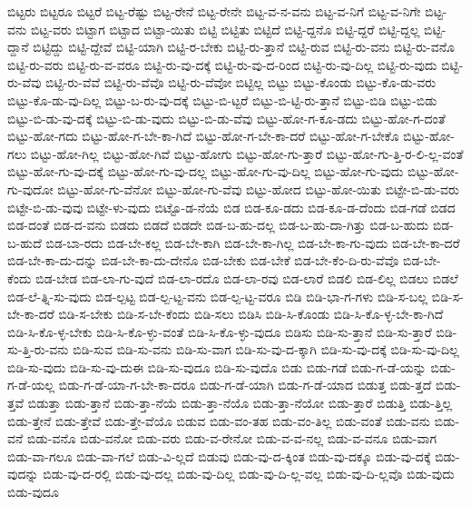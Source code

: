 {ಬಿಟ್ಟರು
ಬಿಟ್ಟರೂ
ಬಿಟ್ಟರೆ
ಬಿಟ್ಟ-ರೆಷ್ಟು
ಬಿಟ್ಟ-ರೇನೆ
ಬಿಟ್ಟ-ರೇನೇ
ಬಿಟ್ಟ-ವ-ನ-ವನು
ಬಿಟ್ಟ-ವ-ನಿಗೆ
ಬಿಟ್ಟ-ವ-ನಿಗೇ
ಬಿಟ್ಟ-ವನು
ಬಿಟ್ಟ-ವರು
ಬಿಟ್ಟಾಗ
ಬಿಟ್ಟಾದ
ಬಿಟ್ಟಾ-ಯಿತು
ಬಿಟ್ಟಿ
ಬಿಟ್ಟಿತು
ಬಿಟ್ಟಿದೆ
ಬಿಟ್ಟಿ-ದ್ದನೊ
ಬಿಟ್ಟಿ-ದ್ದರೆ
ಬಿಟ್ಟಿ-ದ್ದಲ್ಲ
ಬಿಟ್ಟಿ-ದ್ದಾನೆ
ಬಿಟ್ಟಿದ್ದು
ಬಿಟ್ಟಿ-ದ್ದೇವೆ
ಬಿಟ್ಟಿ-ಯಾಗಿ
ಬಿಟ್ಟಿ-ರ-ಬೇಕು
ಬಿಟ್ಟಿ-ರು-ತ್ತಾನೆ
ಬಿಟ್ಟಿ-ರುವ
ಬಿಟ್ಟಿ-ರು-ವನು
ಬಿಟ್ಟಿ-ರು-ವನೊ
ಬಿಟ್ಟಿ-ರು-ವರು
ಬಿಟ್ಟಿ-ರು-ವ-ವರೂ
ಬಿಟ್ಟಿ-ರು-ವು-ದಕ್ಕೆ
ಬಿಟ್ಟಿ-ರು-ವು-ದ-ರಿಂದ
ಬಿಟ್ಟಿ-ರು-ವು-ದಿಲ್ಲ
ಬಿಟ್ಟಿ-ರು-ವುದು
ಬಿಟ್ಟಿ-ರು-ವೆವು
ಬಿಟ್ಟಿ-ರು-ವೆವೆ
ಬಿಟ್ಟಿ-ರು-ವೆವೊ
ಬಿಟ್ಟಿ-ರು-ವೆವೋ
ಬಿಟ್ಟಿಲ್ಲ
ಬಿಟ್ಟು
ಬಿಟ್ಟು-ಕೊಂಡು
ಬಿಟ್ಟು-ಕೊ-ಡು-ವರು
ಬಿಟ್ಟು-ಕೊ-ಡು-ವು-ದಿಲ್ಲ
ಬಿಟ್ಟು-ಬ-ರು-ವು-ದಕ್ಕೆ
ಬಿಟ್ಟು-ಬಿ-ಟ್ಟರೆ
ಬಿಟ್ಟು-ಬಿ-ಟ್ಟಿ-ರು-ತ್ತಾನೆ
ಬಿಟ್ಟು-ಬಿಡಿ
ಬಿಟ್ಟು-ಬಿಡು
ಬಿಟ್ಟು-ಬಿ-ಡು-ವು-ದಕ್ಕೆ
ಬಿಟ್ಟು-ಬಿ-ಡು-ವುದು
ಬಿಟ್ಟು-ಬಿ-ಡು-ವೆವು
ಬಿಟ್ಟು-ಹೋ-ಗ-ಕೂ-ಡದು
ಬಿಟ್ಟು-ಹೋ-ಗ-ದಂತೆ
ಬಿಟ್ಟು-ಹೋ-ಗದು
ಬಿಟ್ಟು-ಹೋ-ಗ-ಬೇ-ಕಾ-ಗಿದೆ
ಬಿಟ್ಟು-ಹೋ-ಗ-ಬೇ-ಕಾ-ದರೆ
ಬಿಟ್ಟು-ಹೋ-ಗ-ಬೇಕೊ
ಬಿಟ್ಟು-ಹೋ-ಗಲು
ಬಿಟ್ಟು-ಹೋ-ಗಿಲ್ಲ
ಬಿಟ್ಟು-ಹೋ-ಗಿವೆ
ಬಿಟ್ಟು-ಹೋಗು
ಬಿಟ್ಟು-ಹೋ-ಗು-ತ್ತಾರೆ
ಬಿಟ್ಟು-ಹೋ-ಗು-ತ್ತಿ-ರ-ಲಿ-ಲ್ಲ-ವಂತೆ
ಬಿಟ್ಟು-ಹೋ-ಗು-ವು-ದಕ್ಕೆ
ಬಿಟ್ಟು-ಹೋ-ಗು-ವು-ದಲ್ಲ
ಬಿಟ್ಟು-ಹೋ-ಗು-ವು-ದಿಲ್ಲ
ಬಿಟ್ಟು-ಹೋ-ಗು-ವುದು
ಬಿಟ್ಟು-ಹೋ-ಗು-ವುದೋ
ಬಿಟ್ಟು-ಹೋ-ಗು-ವೆನೋ
ಬಿಟ್ಟು-ಹೋ-ಗು-ವೆವು
ಬಿಟ್ಟು-ಹೋದ
ಬಿಟ್ಟು-ಹೋ-ಯಿತು
ಬಿಟ್ಟೇ-ಬಿ-ಡು-ವರು
ಬಿಟ್ಟೇ-ಬಿ-ಡು-ವುವು
ಬಿಟ್ಟೇ-ಳು-ವುದು
ಬಿಟ್ಟೊ-ಡ-ನೆಯೆ
ಬಿಡ
ಬಿಡ-ಕೂ-ಡದು
ಬಿಡ-ಕೂ-ಡ-ದೆಂದು
ಬಿಡ-ಗಡೆ
ಬಿಡದ
ಬಿಡ-ದಂತೆ
ಬಿಡ-ದ-ವನು
ಬಿಡದು
ಬಿಡದೆ
ಬಿಡದೇ
ಬಿಡ-ಬ-ಹು-ದಲ್ಲ
ಬಿಡ-ಬ-ಹು-ದಾ-ಗಿತ್ತು
ಬಿಡ-ಬ-ಹುದು
ಬಿಡ-ಬ-ಹುದೆ
ಬಿಡ-ಬಾ-ರದು
ಬಿಡ-ಬೇ-ಕಲ್ಲ
ಬಿಡ-ಬೇ-ಕಾಗಿ
ಬಿಡ-ಬೇ-ಕಾ-ಗಿಲ್ಲ
ಬಿಡ-ಬೇ-ಕಾ-ಗು-ವುದು
ಬಿಡ-ಬೇ-ಕಾ-ದರೆ
ಬಿಡ-ಬೇ-ಕಾ-ದು-ದನ್ನು
ಬಿಡ-ಬೇ-ಕಾ-ದು-ದೇನೊ
ಬಿಡ-ಬೇಕು
ಬಿಡ-ಬೇಕೆ
ಬಿಡ-ಬೇ-ಕೆಂ-ದಿ-ರು-ವೆವೊ
ಬಿಡ-ಬೇ-ಕೆಂದು
ಬಿಡ-ಬೇಡ
ಬಿಡ-ಲಾ-ಗು-ವುದೆ
ಬಿಡ-ಲಾ-ರದೊ
ಬಿಡ-ಲಾ-ರವು
ಬಿಡ-ಲಾರೆ
ಬಿಡಲಿ
ಬಿಡ-ಲಿಲ್ಲ
ಬಿಡಲು
ಬಿಡಲೆ
ಬಿಡ-ಲೆ-ತ್ನಿ-ಸು-ವುದು
ಬಿಡ-ಲ್ಪಟ್ಟ
ಬಿಡ-ಲ್ಪ-ಟ್ಟ-ವನು
ಬಿಡ-ಲ್ಪ-ಟ್ಟ-ವರೂ
ಬಿಡಿ
ಬಿಡಿ-ಭಾ-ಗ-ಗಳು
ಬಿಡಿ-ಸ-ಬಲ್ಲ
ಬಿಡಿ-ಸ-ಬೇ-ಕಾ-ದರೆ
ಬಿಡಿ-ಸ-ಬೇಕು
ಬಿಡಿ-ಸ-ಬೇ-ಕೆಂದು
ಬಿಡಿ-ಸಲು
ಬಿಡಿಸಿ
ಬಿಡಿ-ಸಿ-ಕೊಂಡು
ಬಿಡಿ-ಸಿ-ಕೊ-ಳ್ಳ-ಬೇ-ಕಾ-ಗಿದೆ
ಬಿಡಿ-ಸಿ-ಕೊ-ಳ್ಳ-ಬೇಕು
ಬಿಡಿ-ಸಿ-ಕೊ-ಳ್ಳು-ವಂತೆ
ಬಿಡಿ-ಸಿ-ಕೊ-ಳ್ಳು-ವುದೂ
ಬಿಡಿಸು
ಬಿಡಿ-ಸು-ತ್ತಾನೆ
ಬಿಡಿ-ಸು-ತ್ತಾರೆ
ಬಿಡಿ-ಸು-ತ್ತಿ-ರು-ವನು
ಬಿಡಿ-ಸುವ
ಬಿಡಿ-ಸು-ವನು
ಬಿಡಿ-ಸು-ವಾಗ
ಬಿಡಿ-ಸು-ವು-ದ-ಕ್ಕಾಗಿ
ಬಿಡಿ-ಸು-ವು-ದಕ್ಕೆ
ಬಿಡಿ-ಸು-ವು-ದಿಲ್ಲ
ಬಿಡಿ-ಸು-ವುದು
ಬಿಡಿ-ಸು-ವು-ದುಈ
ಬಿಡಿ-ಸು-ವುದೂ
ಬಿಡಿ-ಸು-ವುದೊ
ಬಿಡು
ಬಿಡು-ಗಡೆ
ಬಿಡು-ಗ-ಡೆ-ಯನ್ನು
ಬಿಡು-ಗ-ಡೆ-ಯಲ್ಲ
ಬಿಡು-ಗ-ಡೆ-ಯಾ-ಗ-ಬೇ-ಕಾ-ದರೂ
ಬಿಡು-ಗ-ಡೆ-ಯಾಗಿ
ಬಿಡು-ಗ-ಡೆ-ಯಾದ
ಬಿಡುತ್ತ
ಬಿಡು-ತ್ತದೆ
ಬಿಡು-ತ್ತವೆ
ಬಿಡುತ್ತಾ
ಬಿಡು-ತ್ತಾನೆ
ಬಿಡು-ತ್ತಾ-ನೆಯೆ
ಬಿಡು-ತ್ತಾ-ನೆಯೊ
ಬಿಡು-ತ್ತಾ-ನೆಯೋ
ಬಿಡು-ತ್ತಾರೆ
ಬಿಡುತ್ತಿ
ಬಿಡು-ತ್ತಿಲ್ಲ
ಬಿಡು-ತ್ತೇನೆ
ಬಿಡು-ತ್ತೇವೆ
ಬಿಡು-ತ್ತೇ-ವೆಯೊ
ಬಿಡುವ
ಬಿಡು-ವಂ-ತಹ
ಬಿಡು-ವಂ-ತಿಲ್ಲ
ಬಿಡು-ವಂತೆ
ಬಿಡು-ವನು
ಬಿಡು-ವನೆ
ಬಿಡು-ವನೊ
ಬಿಡು-ವನೋ
ಬಿಡು-ವರು
ಬಿಡು-ವ-ರೇನೋ
ಬಿಡು-ವ-ವ-ನಲ್ಲ
ಬಿಡು-ವ-ವನೂ
ಬಿಡು-ವಾಗ
ಬಿಡು-ವಾ-ಗಲೂ
ಬಿಡು-ವಾ-ಗಲೆ
ಬಿಡು-ವಿ-ಲ್ಲದೆ
ಬಿಡುವು
ಬಿಡು-ವು-ದ-ಕ್ಕಿಂತ
ಬಿಡು-ವು-ದಕ್ಕೂ
ಬಿಡು-ವು-ದಕ್ಕೆ
ಬಿಡು-ವುದನ್ನು
ಬಿಡು-ವು-ದ-ರಲ್ಲಿ
ಬಿಡು-ವು-ದಲ್ಲ
ಬಿಡು-ವು-ದಿಲ್ಲ
ಬಿಡು-ವು-ದಿ-ಲ್ಲ-ವಲ್ಲ
ಬಿಡು-ವು-ದಿ-ಲ್ಲವೊ
ಬಿಡು-ವುದು
ಬಿಡು-ವುದೂ
}
